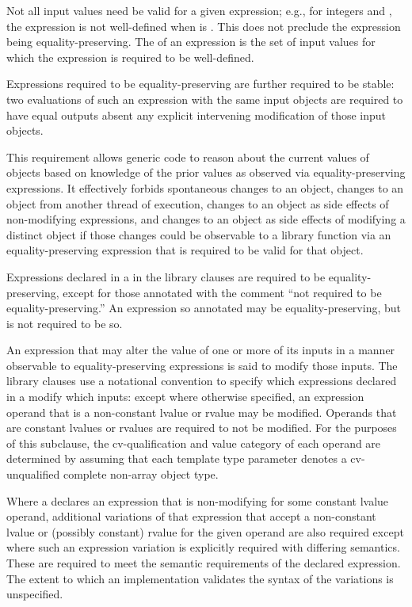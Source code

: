 \pnum
Not all input values need be valid for a given expression; e.g., for integers
 and , the expression  is not well-defined when
 is . This does not preclude the expression 
being equality-preserving. The  of an expression is the set of
input values for which the expression is required to be well-defined.

\pnum
Expressions required to be equality-preserving are further
required to be stable: two evaluations of such an expression with the same input
objects are required to have equal outputs absent any explicit intervening
modification of those input objects.
\begin{note}
This requirement allows generic code to reason about the current values of
objects based on knowledge of the prior values as observed via
equality-preserving expressions. It effectively forbids spontaneous changes to
an object, changes to an object from another thread of execution, changes to an
object as side effects of non-modifying expressions, and changes to an object as
side effects of modifying a distinct object if those changes could be observable
to a library function via an equality-preserving expression that is required to
be valid for that object.
\end{note}

\pnum
Expressions declared in a  in the library clauses are
required to be equality-preserving, except for those annotated with the comment
``not required to be equality-preserving.'' An expression so annotated
may be equality-preserving, but is not required to be so.

\pnum
An expression that may alter the value of one or more of its inputs in a manner
observable to equality-preserving expressions is said to modify those inputs.
The library clauses use a notational convention to specify which expressions declared
in a  modify which inputs: except where
otherwise specified, an expression operand that is a non-constant lvalue or
rvalue may be modified. Operands that are constant lvalues or rvalues are
required to not be modified.
For the purposes of this subclause,
the cv-qualification and value category of each operand
are determined by assuming
that each template type parameter
denotes a cv-unqualified complete non-array object type.

\pnum
Where a  declares an expression that is
non-modifying for some constant lvalue operand, additional variations of that
expression that accept a non-constant lvalue or (possibly constant) rvalue for
the given operand are also required except where such an expression variation is
explicitly required with differing semantics. These
 are required to meet the semantic
requirements of the declared expression. The extent to which an implementation
validates the syntax of the variations is unspecified.


